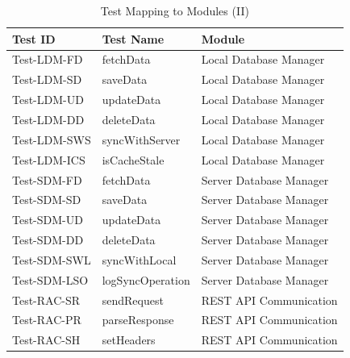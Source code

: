 \documentclass[12pt, titlepage]{article}
\begin{document}
\begin{table}[htpb!]
  \centering
  \begin{tabular}{|l|p{6cm}|p{4cm}|}
    \hline
    \textbf{Test ID} & \textbf{Test Name} & \textbf{Module}         \\
    \hline
    Test-LDM-FD      & fetchData          & Local Database Manager  \\
    \hline
    Test-LDM-SD      & saveData           & Local Database Manager  \\
    \hline
    Test-LDM-UD      & updateData         & Local Database Manager  \\
    \hline
    Test-LDM-DD      & deleteData         & Local Database Manager  \\
    \hline
    Test-LDM-SWS     & syncWithServer     & Local Database Manager  \\
    \hline
    Test-LDM-ICS     & isCacheStale       & Local Database Manager  \\
    \hline
    Test-SDM-FD      & fetchData          & Server Database Manager \\
    \hline
    Test-SDM-SD      & saveData           & Server Database Manager \\
    \hline
    Test-SDM-UD      & updateData         & Server Database Manager \\
    \hline
    Test-SDM-DD      & deleteData         & Server Database Manager \\
    \hline
    Test-SDM-SWL     & syncWithLocal      & Server Database Manager \\
    \hline
    Test-SDM-LSO     & logSyncOperation   & Server Database Manager \\
    \hline
    Test-RAC-SR      & sendRequest        & REST API Communication  \\
    \hline
    Test-RAC-PR      & parseResponse      & REST API Communication  \\
    \hline
    Test-RAC-SH      & setHeaders         & REST API Communication  \\
    \hline
  \end{tabular}
  \caption{Test Mapping to Modules (II)}
  \label{tab:test_mapping2}
\end{table}
\end{document}
